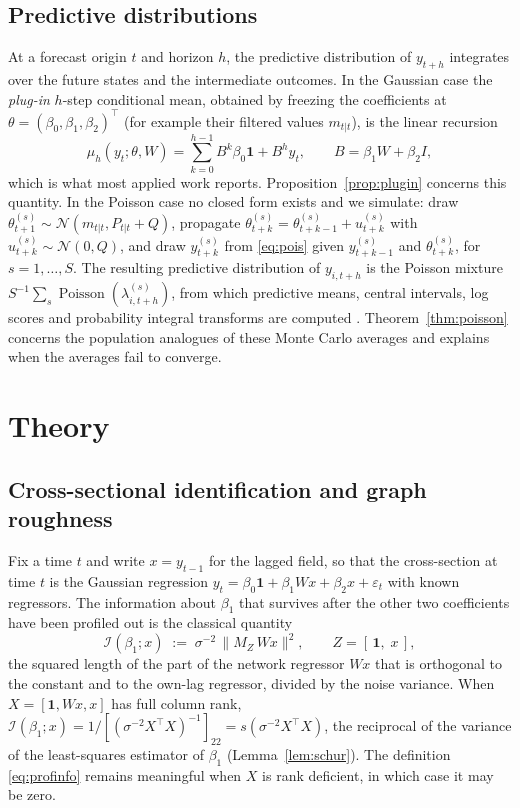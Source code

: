 \documentclass[12pt]{article}
\theoremstyle{plain}
\theoremstyle{definition}
\theoremstyle{remark}
\newcommand{\one}{\mathbf{1}}
\newcommand{\calI}{\mathcal{I}}
\newcommand{\calN}{\mathcal{N}}
\newcommand{\Pois}{\operatorname{Poisson}}
\newcommand{\T}{^{\top}}
\begin{document}
\subsection{Predictive distributions}\label{sec:pred}
At a forecast origin $t$ and horizon $h$, the predictive distribution of $y_{t+h}$ integrates over the future states and the intermediate outcomes. In the Gaussian case the \emph{plug-in} $h$-step conditional mean, obtained by freezing the coefficients at $\theta=(\beta_0,\beta_1,\beta_2)\T$ (for example their filtered values $m_{t|t}$), is the linear recursion
\begin{equation}\label{eq:plugin}
\mu_h(y_t;\theta,W)=\sum_{k=0}^{h-1}B^k\beta_0\one+B^hy_t,\qquad B=\beta_1W+\beta_2I ,
\end{equation}
which is what most applied work reports. Proposition~\ref{prop:plugin} concerns this quantity. In the Poisson case no closed form exists and we simulate: draw $\theta^{(s)}_{t+1}\sim\calN(m_{t|t},P_{t|t}+Q)$, propagate $\theta^{(s)}_{t+k}=\theta^{(s)}_{t+k-1}+u^{(s)}_{t+k}$ with $u^{(s)}_{t+k}\sim\calN(0,Q)$, and draw $y^{(s)}_{t+k}$ from \eqref{eq:pois} given $y^{(s)}_{t+k-1}$ and $\theta^{(s)}_{t+k}$, for $s=1,\dots,S$. The resulting predictive distribution of $y_{i,t+h}$ is the Poisson mixture $S^{-1}\sum_s\Pois(\lambda^{(s)}_{i,t+h})$, from which predictive means, central intervals, log scores and probability integral transforms are computed \citep{czado2009predictive}. Theorem~\ref{thm:poisson} concerns the population analogues of these Monte Carlo averages and explains when the averages fail to converge.

\section{Theory}\label{sec:theory}

\subsection{Cross-sectional identification and graph roughness}\label{sec:ident}

Fix a time $t$ and write $x=y_{t-1}$ for the lagged field, so that the cross-section at time $t$ is the Gaussian regression $y_t=\beta_0\one+\beta_1Wx+\beta_2x+\varepsilon_t$ with known regressors. The information about $\beta_1$ that survives after the other two coefficients have been profiled out is the classical quantity
\begin{equation}\label{eq:profinfo}
\calI(\beta_1;x)\;:=\;\sigma^{-2}\,\big\|M_{Z}\,Wx\big\|^2,\qquad Z=[\,\one,\;x\,],
\end{equation}
the squared length of the part of the network regressor $Wx$ that is orthogonal to the constant and to the own-lag regressor, divided by the noise variance. When $X=[\one,Wx,x]$ has full column rank, $\calI(\beta_1;x)=1/[(\sigma^{-2}X\T X)^{-1}]_{22}=s(\sigma^{-2}X\T X)$, the reciprocal of the variance of the least-squares estimator of $\beta_1$ (Lemma~\ref{lem:schur}). The definition \eqref{eq:profinfo} remains meaningful when $X$ is rank deficient, in which case it may be zero.
\end{document}
